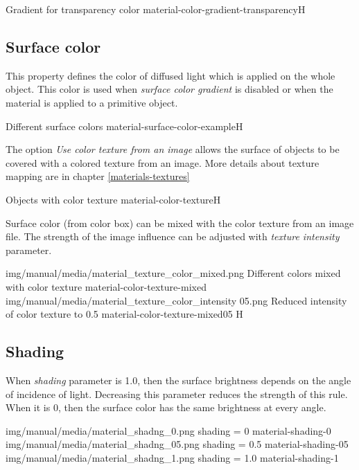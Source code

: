 {Gradient for transparency color}
{material-color-gradient-transparency}{H}

\subsection{Surface color}\label{materials-surface_color}

This property defines the color of diffused light which is applied on the whole object. This color is used when \emph{surface color gradient} is disabled or when the material is applied to a primitive object.

{Different surface colors}
{material-surface-color-example}{H}

The option \emph{Use color texture from an image} allows the surface of objects to be covered with a colored texture from an image. More details about texture mapping are in chapter \ref{materials-textures}

{Objects with color texture}
{material-color-texture}{H}

Surface color (from color box) can be mixed with the color texture from an image file. The strength of the image influence can be adjusted with \emph{texture intensity} parameter.

\twoImagesWithTwoCaptionsFullWidth
{img/manual/media/material_texture_color_mixed.png}
{Different colors mixed with color texture}
{material-color-texture-mixed}
{img/manual/media/material_texture_color_intensity 05.png}
{Reduced intensity of color texture to 0.5}
{material-color-texture-mixed05}
{H}

\subsection{Shading}\label{materials-shading}

When \emph{shading} parameter is 1.0, then the surface brightness depends on the angle of incidence of light. Decreasing this parameter reduces the strength of this rule. When it is 0, then the surface color has the same brightness at every angle. 

\threeImagesWithTwoCaptionsFullWidth
{img/manual/media/material_shadng_0.png}
{shading = 0}
{material-shading-0}
{img/manual/media/material_shadng_05.png}
{shading = 0.5}
{material-shading-05}
{img/manual/media/material_shadng_1.png}
{shading = 1.0}
{material-shading-1}

